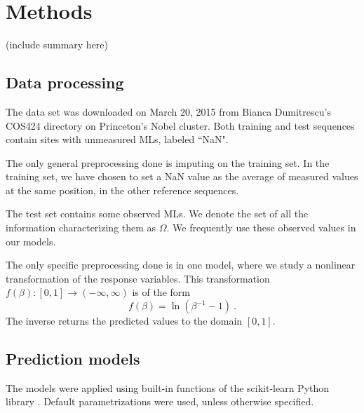 \documentclass{article} %
\begin{document}
\section{Methods}
(include summary here)

\subsection{Data processing}

The data set was downloaded on March 20, 2015 from Bianca Dumitrescu's COS424 directory on Princeton's Nobel cluster. Both training and test sequences contain sites with unmeasured MLs, labeled ``NaN".

The only general preprocessing done is imputing on the training set. In the training set, we have chosen to set a NaN value as the average of measured values at the same position, in the other reference sequences. 

The test set contains some observed MLs. We denote the set of all the information characterizing them as $\Omega$. We frequently use these observed values in our models.

The only specific preprocessing done is in one model, where we study a nonlinear transformation of the response variables. This transformation $f(\beta): [0,1] \to (-\infty,\infty)$ is of the form
\[ f(\beta) = \ln(\beta^{-1} - 1) \ .\]
The inverse returns the predicted values to the domain $[0,1]$.

\subsection{Prediction models}

The models were applied using built-in functions of the scikit-learn Python library \cite{scikit-learn}. Default parametrizations were used, unless otherwise specified.
\end{document}
